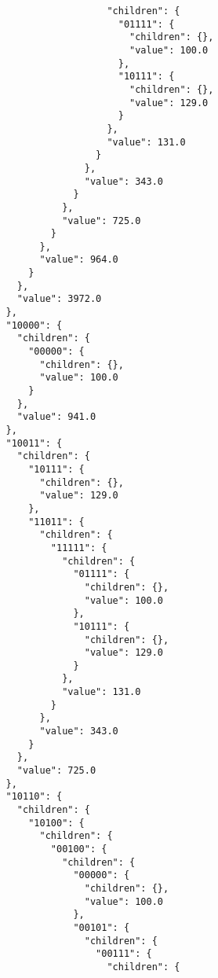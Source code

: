 \documentclass{article}
\begin{document}
\begin{listing}
\begin{verbatim}
                                  "children": {
                                    "01111": {
                                      "children": {},
                                      "value": 100.0
                                    },
                                    "10111": {
                                      "children": {},
                                      "value": 129.0
                                    }
                                  },
                                  "value": 131.0
                                }
                              },
                              "value": 343.0
                            }
                          },
                          "value": 725.0
                        }
                      },
                      "value": 964.0
                    }
                  },
                  "value": 3972.0
                },
                "10000": {
                  "children": {
                    "00000": {
                      "children": {},
                      "value": 100.0
                    }
                  },
                  "value": 941.0
                },
                "10011": {
                  "children": {
                    "10111": {
                      "children": {},
                      "value": 129.0
                    },
                    "11011": {
                      "children": {
                        "11111": {
                          "children": {
                            "01111": {
                              "children": {},
                              "value": 100.0
                            },
                            "10111": {
                              "children": {},
                              "value": 129.0
                            }
                          },
                          "value": 131.0
                        }
                      },
                      "value": 343.0
                    }
                  },
                  "value": 725.0
                },
                "10110": {
                  "children": {
                    "10100": {
                      "children": {
                        "00100": {
                          "children": {
                            "00000": {
                              "children": {},
                              "value": 100.0
                            },
                            "00101": {
                              "children": {
                                "00111": {
                                  "children": {

\end{verbatim}
\end{listing}
\end{document}
